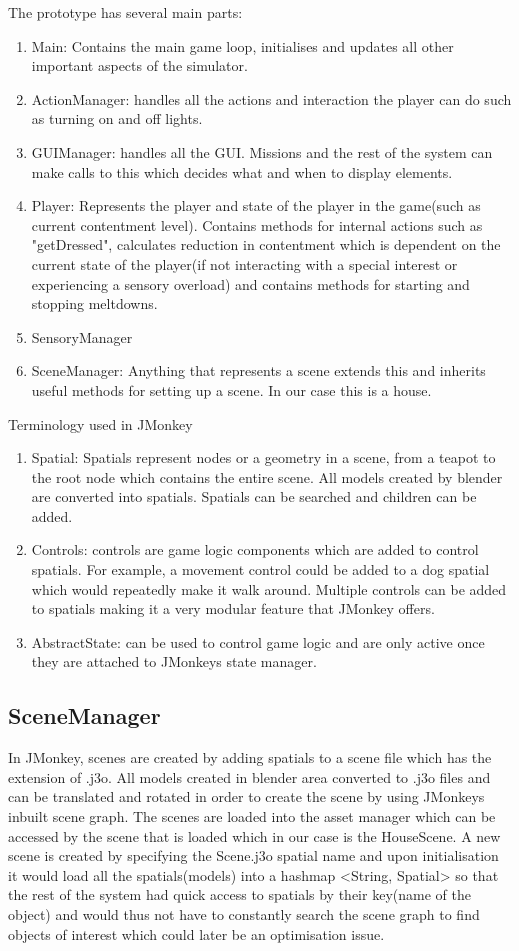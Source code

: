 \documentclass[11pt]{report}
\begin{document}
The prototype has several main parts:
\begin{enumerate}
\item Main: Contains the main game loop, initialises and updates all other important aspects of the simulator.
\item ActionManager: handles all the actions and interaction the player can do such as turning on and off lights.
\item GUIManager: handles all the GUI. Missions and the rest of the system can make calls to this which decides what and when to display elements. 
\item Player: Represents the player and state of the player in the game(such as current contentment level). Contains methods for internal actions such as "getDressed", calculates reduction in contentment which is dependent on the current state of the player(if not interacting with a special interest or experiencing a sensory overload) and contains methods for starting and stopping meltdowns.
\item SensoryManager
\item SceneManager: Anything that represents a scene extends this and inherits useful methods for setting up a scene. In our case this is a house. 
\end{enumerate}

Terminology used in JMonkey
\begin{enumerate}
\item Spatial: Spatials represent nodes or a geometry in a scene, from a teapot to the root node which contains the entire scene. All models created by blender are converted into spatials. Spatials can be searched and children can be added.
\item Controls: controls are game logic components which are added to control spatials. For example, a movement control could be added to a dog spatial which would repeatedly make it walk around. Multiple controls can be added to spatials making it a very modular feature that JMonkey offers. 
\item AbstractState: can be used to control game logic and are only active once they are attached to JMonkeys state manager.
\end{enumerate}

\subsection{SceneManager}
In JMonkey, scenes are created by adding spatials to a scene file which has the extension of .j3o. All models created in blender area converted to .j3o files and can be translated and rotated in order to create the scene by using JMonkeys inbuilt scene graph. The scenes are loaded into the asset manager which can be accessed by the scene that is loaded which in our case is the HouseScene. A new scene is created by specifying the Scene.j3o spatial name and upon initialisation it would load all the spatials(models) into a hashmap <String, Spatial> so that the rest of the system had quick access to spatials by their key(name of the object) and would thus not have to constantly search the scene graph to find objects of interest which could later be an optimisation issue. 
\end{document}
